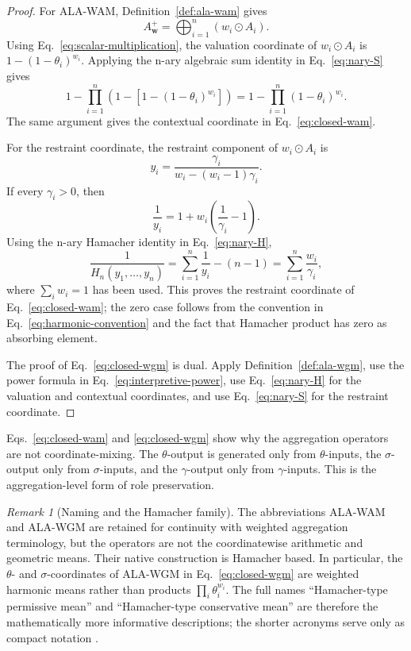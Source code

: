 \documentclass[reqno,final]{amsart}
\theoremstyle{definition}
\theoremstyle{plain}
\theoremstyle{remark}
\newtheorem{remark}{Remark}
\begin{document}
\begin{proof}
For ALA-WAM, Definition~\ref{def:ala-wam} gives
\[
A_{\mathbf{w}}^{+}=\bigoplus_{i=1}^{n}(w_i\odot A_i).
\]
Using Eq.~\eqref{eq:scalar-multiplication}, the valuation coordinate of \(w_i\odot A_i\) is \(1-(1-\theta_i)^{w_i}\). Applying the n-ary algebraic sum identity in Eq.~\eqref{eq:nary-S} gives
\[
1-\prod_{i=1}^{n}\left(1-[1-(1-\theta_i)^{w_i}]\right)
=
1-\prod_{i=1}^{n}(1-\theta_i)^{w_i}.
\]
The same argument gives the contextual coordinate in Eq.~\eqref{eq:closed-wam}.

For the restraint coordinate, the restraint component of \(w_i\odot A_i\) is
\[
y_i=\frac{\gamma_i}{w_i-(w_i-1)\gamma_i}.
\]
If every \(\gamma_i>0\), then
\[
\frac{1}{y_i}=1+w_i\left(\frac{1}{\gamma_i}-1\right).
\]
Using the n-ary Hamacher identity in Eq.~\eqref{eq:nary-H},
\[
\frac{1}{H_n(y_1,\ldots,y_n)}
=
\sum_{i=1}^{n}\frac{1}{y_i}-(n-1)
=
\sum_{i=1}^{n}\frac{w_i}{\gamma_i},
\]
where \(\sum_i w_i=1\) has been used. This proves the restraint coordinate of Eq.~\eqref{eq:closed-wam}; the zero case follows from the convention in Eq.~\eqref{eq:harmonic-convention} and the fact that Hamacher product has zero as absorbing element.

The proof of Eq.~\eqref{eq:closed-wgm} is dual. Apply Definition~\ref{def:ala-wgm}, use the power formula in Eq.~\eqref{eq:interpretive-power}, use Eq.~\eqref{eq:nary-H} for the valuation and contextual coordinates, and use Eq.~\eqref{eq:nary-S} for the restraint coordinate.
\end{proof}

Eqs.~\eqref{eq:closed-wam} and \eqref{eq:closed-wgm} show why the aggregation operators are not coordinate-mixing. The \(\theta\)-output is generated only from \(\theta\)-inputs, the \(\sigma\)-output only from \(\sigma\)-inputs, and the \(\gamma\)-output only from \(\gamma\)-inputs. This is the aggregation-level form of role preservation.

\begin{remark}[Naming and the Hamacher family]
\label{rem:hamacher-naming}
The abbreviations ALA-WAM and ALA-WGM are retained for continuity with weighted aggregation terminology, but the operators are not the coordinatewise arithmetic and geometric means. Their native construction is Hamacher based. In particular, the \(\theta\)- and \(\sigma\)-coordinates of ALA-WGM in Eq.~\eqref{eq:closed-wgm} are weighted harmonic means rather than products \(\prod_i\theta_i^{w_i}\). The full names ``Hamacher-type permissive mean'' and ``Hamacher-type conservative mean'' are therefore the mathematically more informative descriptions; the shorter acronyms serve only as compact notation \cite{LiuHamacher2014}.
\end{remark}
\end{document}
